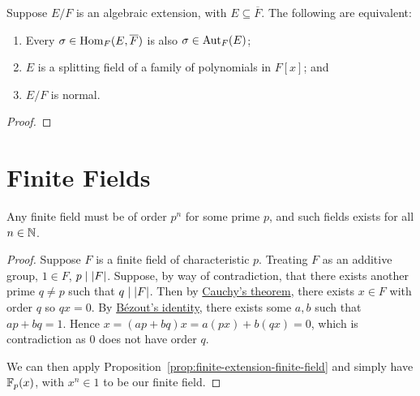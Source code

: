 \begin{theorem}\label{thm:normal-extension-equivalence}
    Suppose \(E/F\) is an algebraic extension, with \(E \subseteq \overline{F}\).
    The following are equivalent:
    \begin{enumerate}[label={(\alph*)}, itemsep=0mm]
        \item Every \(\sigma\in\operatorname{Hom}_F(E,\overline{F})\) is also \(\sigma\in\operatorname{Aut}_F(E)\);
        \item \(E\) is a splitting field of a family of polynomials in \(F[x]\); and
        \item \(E/F\) is normal.
    \end{enumerate}
\end{theorem}
\begin{proof}
\end{proof}


\section{Finite Fields}

\begin{proposition}\label{prop:existence-finite-fields}
    Any finite field must be of order \(p^n\) for some prime \(p\),
    and such fields exists for all \(n \in \mathbb{N}\).
\end{proposition}
\begin{proof}
    Suppose \(F\) is a finite field of characteristic \(p\).
    Treating \(F\) as an additive group, \(1 \in F\), \(p \mid \abs{F}\).
    Suppose, by way of contradiction,
    that there exists another prime \(q \neq p\) such that \(q \mid \abs{F}\).
    Then by \hyperref[thm:cayley]{Cauchy's theorem},
    there exists \(x \in F\) with order \(q\) so \(qx = 0\).
    By \hyperref[thm:bezout]{B\'ezout's identity},
    there exists some \(a,b\) such that \(ap + bq = 1\).
    Hence \(x = (ap+bq)x = a(px) + b(qx) = 0\),
    which is contradiction as \(0\) does not have order \(q\).

    We can then apply Proposition~\ref{prop:finite-extension-finite-field}
    and simply have \(\mathbb{F}_p(x)\), with \(x^n \in 1\) to be our finite field.
\end{proof}

